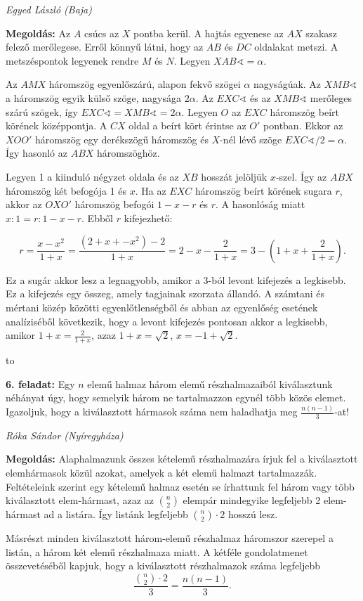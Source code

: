 \documentclass[a4paper,10pt]{article}
\newcommand{\ki}[2]{\hfill {\it #1 (#2)}\medskip}
\newcommand{\vonal}{\hbox to \hsize{\hskip2truecm\hrulefill\hskip2truecm}}
\begin{document}
\ki{Egyed László }{Baja}\medskip

{\bf Megoldás:} Az $A$ csúcs az $X$ pontba kerül. A hajtás egyenese az $AX$ szakasz felező merőlegese.
Erről könnyű látni, hogy az $AB$ és $DC$ oldalakat metszi. A metszéspontok legyenek rendre $M$
és $N$. Legyen $XAB \sphericalangle  = \alpha$.

Az $AMX$ háromszög egyenlőszárú, alapon fekvő szögei $\alpha$  nagyságúak. Az $XMB\sphericalangle$  a
háromszög egyik külső szöge, nagysága $2\alpha$. Az $EXC\sphericalangle$  és az $XMB\sphericalangle$  merőleges szárú szögek,
így $EXC\sphericalangle =XMB\sphericalangle =2\alpha$. Legyen $O$ az $EXC$ háromszög beírt körének középpontja. A $CX$ oldal
a beírt kört érintse az $O'$ pontban. Ekkor az $XOO'$ háromszög egy derékszögű háromszög és
$X$-nél lévő szöge $EXC\sphericalangle /2= \alpha$. Így hasonló az $ABX$ háromszöghöz.

Legyen 1 a kiinduló négyzet oldala és az $XB$ hosszát jelöljük $x$-szel. Így az $ABX$
háromszög két befogója 1 és $x$. Ha az $EXC$ háromszög beírt körének sugara $r$, akkor az $OXO'$
háromszög befogói $1-x-r$ és $r$. A hasonlóság miatt $x:1=r:1-x-r$. Ebből $r$ kifejezhető:

$$
r=\frac{x-x^2}{1+x}=\frac{(2+x+-x^2)-2}{1+x}
=2-x-\frac{2}{1+x}=3-\left(1+x+\frac{2}{1+x}\right).
$$

Ez a sugár akkor lesz a legnagyobb, amikor a 3-ból levont kifejezés a legkisebb. Ez a
kifejezés egy összeg, amely tagjainak szorzata állandó. A számtani és mértani közép közötti
egyenlőtlenségből és abban az egyenlőség esetének analíziséből következik, hogy a levont
kifejezés pontosan akkor a legkisebb, amikor 
$1+x=\frac{2}{1+x}$, azaz $1+x=\sqrt 2$, $x=-1+\sqrt 2$.


\medskip
\vonal


{\bf 6. feladat:} 
Egy $n$ elemű halmaz három elemű részhalmazaiból kiválasztunk néhányat
úgy, hogy semelyik három ne tartalmazzon egynél több közös elemet. Igazoljuk, hogy a
kiválasztott hármasok száma nem haladhatja meg $\displaystyle{\frac {n(n-1)}{3}}$-at!

\ki{Róka Sándor }{Nyíregyháza}\medskip

{\bf Megoldás:} Alaphalmazunk összes kételemű részhalmazára írjuk fel a kiválasztott
elemhármasok közül azokat, amelyek a két elemű halmazt tartalmazzák.
Feltételeink szerint egy kételemű halmaz esetén se írhattunk fel három vagy több
kiválasztott elem-hármast, azaz az $\binom{n}{2}$ elempár mindegyike legfeljebb 2 elem-hármast ad a
listára. Így listánk legfeljebb $\binom{n}{2}\cdot 2$ hosszú lesz.

Másrészt minden kiválasztott három-elemű részhalmaz háromszor szerepel a listán, a
három két elemű részhalmaza miatt.
A kétféle gondolatmenet összevetéséből kapjuk, hogy a kiválasztott részhalmazok
száma legfeljebb
$$\frac{\binom{n}{2}\cdot 2}{3}=\frac{n(n-1)}{3}.$$
\end{document}
